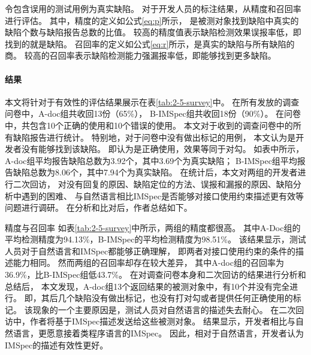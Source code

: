 令包含误用的测试用例为真实缺陷。
对于开发人员的标注结果，从精度和召回率进行评估。
其中，精度的定义如公式\ref{eq:p}所示，
是被测对象找到缺陷中真实的缺陷个数与缺陷报告总数的比值。
较高的精度值表示缺陷检测效果误报率低，即找到的就是缺陷。
召回率的定义如公式\ref{eq:r}所示，是真实的缺陷与所有缺陷的商。
较高的召回率表示缺陷检测能力强漏报率低，即能够找到更多缺陷。




\paragraph{结果}
本文将针对于有效性的评估结果展示在表\ref{tab:2-5-survey}中。
在所有发放的调查问卷中，A-doc组共收回13份（65\%），
B-IMSpec组共收回18份（90\%）。
在问卷中，共包含10个正确的使用和10个错误的使用。
本文对于收到的调查问卷中的所有缺陷报告进行统计。
特别地，对于问卷中没有做出标记的用例，
本文认为是开发者没有能够找到该缺陷。
即认为是正确使用，效果等同于对勾。
如表中所示，A-doc组平均报告缺陷总数为3.92个，其中3.69个为真实缺陷；
B-IMSpec组平均报告缺陷总数为8.06个，其中7.94个为真实缺陷。
在统计后，本文对两组的开发者进行二次回访，
对没有回复的原因、缺陷定位的方法、误报和漏报的原因、缺陷分析中遇到的困难、
与自然语言相比IMSpec是否能够对接口使用约束描述更有效等问题进行调研。
在分析和比对后，作者总结如下。

{\kaishu 精度与召回率 }
如表\ref{tab:2-5-survey}中所示，两组的精度都很高。
其中A-Doc组的平均检测精度为94.13\%，B-IMSpec的平均检测精度为98.51\%。
该结果显示，测试人员对于自然语言和IMSpec都能够正确理解，
即两者对接口使用约束的条件的描述能力相同。
然而两组的召回率却存在较大差异，
其中A-doc组的召回率为36.9\%，比B-IMSpec组低43.7\%。
在对调查问卷本身和二次回访的结果进行分析和总结后，
本文发现，A-doc组13个返回结果的被测对象中，有10个并没有完全进行。
即，其后几个缺陷没有做出标记，也没有打对勾或者提供任何正确使用的标记。
该现象的一个主要原因是，测试人员对自然语言的描述失去耐心。
在二次回访中，作者将基于IMSpec描述发送给这些被测对象。
结果显示，开发者相比与自然语言，更愿意接着类程序语言的IMSpec。
因此，相对于自然语言，开发者认为IMSpec的描述有效性更好。
	
